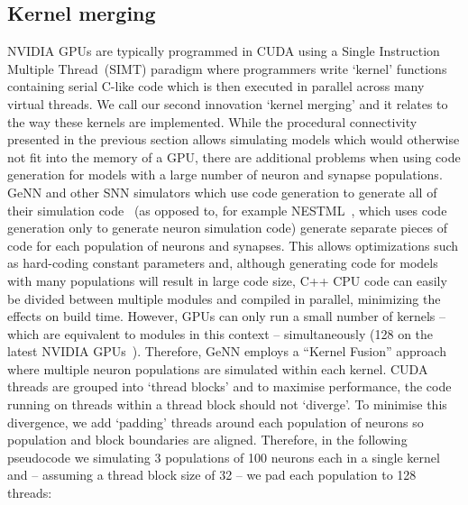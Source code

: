 \documentclass[9pt,a4paper]{amsart}
\begin{document}
\subsection{Kernel merging}
\label{sec:results/kernel_merging}
NVIDIA GPUs are typically programmed in CUDA using a Single Instruction Multiple Thread~(SIMT) paradigm where programmers write `kernel' functions containing serial C-like code which is then executed in parallel across many virtual threads.
We call our second innovation `kernel merging' and it relates to the way these kernels are implemented.
While the procedural connectivity presented in the previous section allows simulating models which would otherwise not fit into the memory of a GPU, there are additional problems when using code generation for models with a large number of neuron and synapse populations.
GeNN and other SNN simulators which use code generation to generate all of their simulation code~\citep{Blundell2018} (as opposed to, for example NESTML~\citep{Plotnikov2016}, which uses code generation only to generate neuron simulation code) generate separate pieces of code for each population of neurons and synapses.
This allows optimizations such as hard-coding constant parameters and, although generating code for models with many populations will result in large code size, C++ CPU code can easily be divided between multiple modules and compiled in parallel, minimizing the effects on build time.
However, GPUs can only run a small number of kernels -- which are equivalent to modules in this context --  simultaneously (128 on the latest NVIDIA GPUs~\citep[p278]{NVIDIACorporation2019}).
Therefore, GeNN employs a ``Kernel Fusion'' approach~\citep{Wang2010} where multiple neuron populations are simulated within each kernel.
CUDA threads are grouped into `thread blocks' and to maximise performance, the code running on  threads within a thread block should not `diverge'.
To minimise this divergence, we add `padding' threads around each population of neurons so population and block boundaries are aligned.
Therefore, in the following pseudocode we simulating 3 populations of 100 neurons each in a single kernel and -- assuming a thread block size of 32 -- we pad each population to 128 threads:
\end{document}
